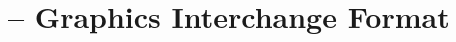 \begin{comment}
  
\end{comment}

\chapter{\gif -- Graphics Interchange Format}
\label{cha:gif}

\begin{refsection}

  \printbibliography[heading=subbibliography]

\end{refsection}